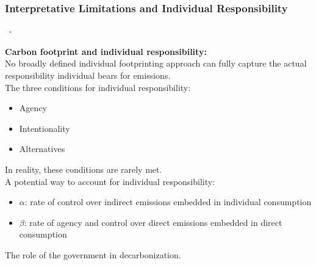 \documentclass[10pt]{beamer}
\begin{document}
\subsubsection{Interpretative Limitations and Individual Responsibility}
\begin{frame}{\subsecname \  - \subsubsecname}

    \textbf{Carbon footprint and individual responsibility:} \\ 
    No broadly defined individual footprinting approach can fully capture the actual responsibility individual bears for emissions. \\

    The three conditions for individual responsibility:
    \begin{itemize}
        \item Agency
        \item Intentionality
        \item Alternatives
    \end{itemize}

    In reality, these conditions are rarely met. \\

    A potential way to account for individual responsibility:
    \begin{itemize}
        \item $\alpha$: rate of control over indirect emissions embedded in individual consumption
        \item $\beta$: rate of agency and control over direct emissions embedded in direct consumption 
    \end{itemize}

    \vspace{5pt}
    The role of the government in decarbonization.
\end{frame}
\end{document}
